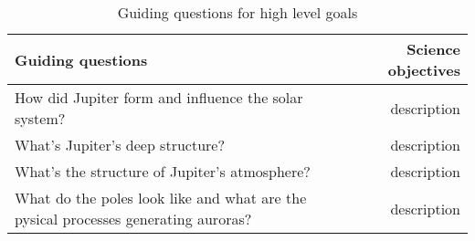 \renewcommand{\arraystretch}{1.5}
\begin{table}[H]
    \centering
    \begin{tabular}{|l|r|}
      
        \hline
        \textbf{Guiding questions} & \textbf{Science objectives} \\ 
        \hline
        How did Jupiter form and influence the solar system? & description \\ 
        \hline
        What's Jupiter's deep structure? & description \\ 
        \hline
        What's the structure of Jupiter's atmosphere? & description \\ 
        \hline
        What do the poles look like and what are the pysical processes generating auroras? & description \\ 
        \hline
     
    \end{tabular}
    \centering
    \caption{Guiding questions for high level goals}
    \label{tab:Guiding questions for high level goals}
\end{table}

\renewcommand{\arraystretch}{1}

